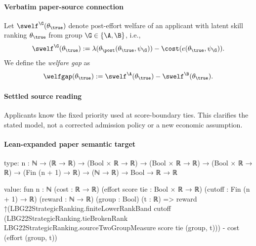 \documentclass[10pt]{article}
\begin{document}
\paragraph{Verbatim paper-source connection}
\begin{ReviewVerbatim}
\begin{definition}
	Let $\swelf^\G(\theta_\true)$ denote post-effort welfare of an applicant with latent skill ranking $\theta_\true$ from group $\G \in \{\A, \B\}$, i.e.,
	\begin{equation}
	\swelf^\G(\theta_\true):= \lambda(\theta_\post(\theta_\true, \psi_\G)) - \cost(e(\theta_\true, \psi_\G)).
	\end{equation}
	We define the \emph{%
		welfare gap} as %
	\begin{equation*}
		\welfgap(\theta_\true):= \swelf^\A(\theta_\true) - \swelf^\B(\theta_\true).
	\end{equation*}
\end{definition}
\end{ReviewVerbatim}

\paragraph{Settled source reading}
\begin{sloppypar}
Applicants know the fixed priority used at score-\allowbreak{}boundary ties.\allowbreak{} This clarifies the stated model, not a corrected admission policy or a new economic assumption.\allowbreak{}
\end{sloppypar}

\paragraph{Lean-expanded paper semantic target}
\begin{ReviewVerbatim}
type:
{n : ℕ} → (ℝ → ℝ) → (Bool × ℝ → ℝ) → (Bool × ℝ → ℝ) → (Bool × ℝ → ℝ) → (Fin (n + 1) → ℝ) → (ℕ → ℝ) → Bool → ℝ → ℝ

value:
fun {n : ℕ} (cost : ℝ → ℝ) (effort score tie : Bool × ℝ → ℝ) (cutoff : Fin (n + 1) → ℝ) (reward : ℕ → ℝ) (group : Bool)
    (t : ℝ) =>
  reward
      ↑(LBG22StrategicRanking.finiteLowerRankBand cutoff
          (LBG22StrategicRanking.tieBrokenRank LBG22StrategicRanking.sourceTwoGroupMeasure score tie (group, t))) -
    cost (effort (group, t))
\end{ReviewVerbatim}
\end{document}
